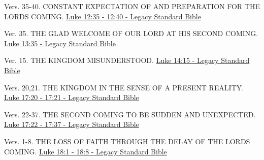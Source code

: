 \documentclass[
  ignorenonframetext,
]{beamer}
\begin{document}
\begin{frame}{12}
\label{section-170}
\begin{block}{Vers. 35-40. CONSTANT EXPECTATION OF AND PREPARATION FOR
THE LORD\textquotesingle S COMING.}
\label{vers.-35-40.-constant-expectation-of-and-preparation-for-the-lords-coming.}
\href{https://read.lsbible.org/?q=lk12\%3A35-40}{Luke 12:35 - 12:40 -
Legacy Standard Bible}
\end{block}
\end{frame}

\begin{frame}{13}
\label{section-171}
\begin{block}{Ver. 35. THE GLAD WELCOME OF OUR LORD AT HIS SECOND
COMING.}
\label{ver.-35.-the-glad-welcome-of-our-lord-at-his-second-coming.}
\href{https://read.lsbible.org/?q=lk13\%3A35}{Luke 13:35 - Legacy
Standard Bible}
\end{block}
\end{frame}

\begin{frame}{14}
\label{section-172}
\begin{block}{Ver. 15. THE KINGDOM MISUNDERSTOOD.}
\label{ver.-15.-the-kingdom-misunderstood.}
\href{https://read.lsbible.org/?q=lk14\%3A15}{Luke 14:15 - Legacy
Standard Bible}
\end{block}
\end{frame}

\begin{frame}{17}
\label{section-173}
\begin{block}{Vers. 20,21. THE KINGDOM IN THE SENSE OF A PRESENT
REALITY.}
\label{vers.-2021.-the-kingdom-in-the-sense-of-a-present-reality.}
\href{https://read.lsbible.org/?q=lk17\%3A20-21}{Luke 17:20 - 17:21 -
Legacy Standard Bible}
\end{block}

\begin{block}{Vers. 22-37. THE SECOND COMING TO BE SUDDEN AND
UNEXPECTED.}
\label{vers.-22-37.-the-second-coming-to-be-sudden-and-unexpected.}
\href{https://read.lsbible.org/?q=lk17\%3A22-37}{Luke 17:22 - 17:37 -
Legacy Standard Bible}
\end{block}
\end{frame}

\begin{frame}{18}
\label{section-174}
\begin{block}{Vers. 1-8. THE LOSS OF FAITH THROUGH THE DELAY OF THE
LORD\textquotesingle S COMING.}
\label{vers.-1-8.-the-loss-of-faith-through-the-delay-of-the-lords-coming.}
\href{https://read.lsbible.org/?q=lk18\%3A1-8}{Luke 18:1 - 18:8 - Legacy
Standard Bible}
\end{block}
\end{frame}
\end{document}
